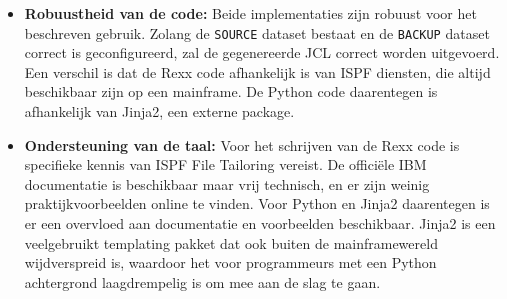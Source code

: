 \begin{itemize}
\item \textbf{Robuustheid van de code:}
Beide implementaties zijn robuust voor het beschreven gebruik. Zolang de \texttt{SOURCE} dataset bestaat en de \texttt{BACKUP} dataset correct is geconfigureerd, zal de gegenereerde JCL correct worden uitgevoerd. Een verschil is dat de Rexx code afhankelijk is van ISPF diensten, die altijd beschikbaar zijn op een mainframe. De Python code daarentegen is afhankelijk van Jinja2, een externe package.
    
\item \textbf{Ondersteuning van de taal:}
Voor het schrijven van de Rexx code is specifieke kennis van ISPF File Tailoring vereist. De officiële IBM documentatie is beschikbaar maar vrij technisch, en er zijn weinig praktijkvoorbeelden online te vinden. Voor Python en Jinja2 daarentegen is er een overvloed aan documentatie en voorbeelden beschikbaar. Jinja2 is een veelgebruikt templating pakket dat ook buiten de mainframewereld wijdverspreid is, waardoor het voor programmeurs met een Python achtergrond laagdrempelig is om mee aan de slag te gaan.
\end{itemize}





    
    
    
